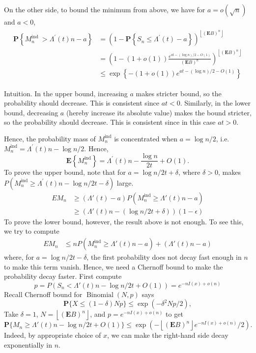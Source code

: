 On the other side, to bound the minimum from above, we have for $a = o(\sqrt{n})$ and $a < 0$,
\begin{align*}
    \begin{aligned}
    \mathbf{P}\left\{M_n^{\text {ind }}>\Lambda^{\prime}(t) n-a\right\} & =\left(1-\mathbf{P}\left\{S_n \leq \Lambda^{\prime}(t)-a\right\}\right)^{\left\lfloor(\mathbf{E} B)^n\right\rfloor} \\
    & =\left(1-(1+o(1)) \frac{e^{a t-(\log n) / 2-O(1)}}{(\mathbf{E} B)^n}\right)^{\left\lfloor(\mathbf{E} B)^n\right\rfloor} \\
    & \leq \exp \left\{-(1+o(1)) e^{a t-(\log n) / 2-O(1)}\right\}
    \end{aligned}
\end{align*}

Intuition. In the upper bound, increasing $a$ makes stricter bound, so the probability should decrease. This is consistent since $a t < 0$. Similarly, in the lower bound, decreasing $a$ (hereby increase its absolute value) makes the bound stricter, so the probability should decrease. This is consistent since in this case $a t > 0$.

Hence, the probability mass of $M_n^{\text{ind}}$ is concentrated when $a = \log n / 2$, i.e. $M_n^{\text{ind}} = \Lambda^{\prime}(t) n - \log n / 2$. Hence,
\[
\mathbf{E}\left\{M_n^{\text{ind}}\right\} = \Lambda^{\prime}(t) n - \frac{\log n}{2t} + O(1).
\]
To prove the upper bound, note that for $a = \log n / 2t + \delta$, where $\delta > 0$, makes $P(M_n^{\text{ind}} \geq \Lambda^{\prime}(t) n - \log n / 2t - \delta)$ large.
\begin{align*}
    E M_n &\ge (\Lambda'(t) - a) P(M_n^{\text{ind}} \ge \Lambda'(t) n - a) \\
    &\ge (\Lambda'(t) n - (\log n / 2t + \delta)) (1 - \epsilon)
\end{align*}
To prove the lower bound, however, the result above is not enough. To see this, we try to compute
\begin{align*}
    E M_n &\le n P(M_n^{\text{ind}} \ge \Lambda'(t) n - a) + (\Lambda'(t) n - a) 
\end{align*}
where, for $a = \log n / 2t - \delta$, the first probability does not decay fast enough in $n$ to make this term vanish. Hence, we need a Chernoff bound to make the probability decay faster. First compute
\[
p = P(S_n < \Lambda'(t) n - \log n / 2t + O(1)) = e^{-n I(x) + o(n)}
\]
Recall Chernoff bound for $\operatorname{Binomial}(N, p)$ says
\[
\mathbf{P}\{X \leq(1-\delta) N p\} \leq \exp \left(-\delta^2 N p / 2\right),
\]
Take $\delta = 1$, $N = \left\lfloor(\mathbf{E} B)^n\right\rfloor$, and $p = e^{-n I(x) + o(n)}$ to get
\[
\mathbf{P}\{M_n \geq \Lambda'(t) n - \log n / 2t + O(1)\} \leq \exp \left(-\left\lfloor(\mathbf{E} B)^n\right\rfloor e^{-n I(x) + o(n)} / 2\right).
\]
Indeed, by appropriate choice of $x$, we can make the right-hand side decay exponentially in $n$.


